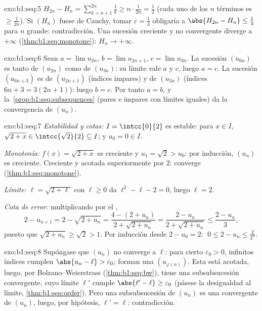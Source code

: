 \begin{solution}{exo:b1:seq:5}
$H_{2n} - H_n = \sum_{k=n+1}^{2n} \frac 1k \geq n \cdot \frac{1}{2n} =
\frac12$ (cada uno de los $n$ términos es $\geq \frac{1}{2n}$). Si
$(H_n)$ fuese de Cauchy, tomar $\varepsilon = \frac13$ obligaría a
$\abs{H_{2n} - H_n} \leq \frac13$ para $n$ grande: contradicción. Una
sucesión creciente y no convergente diverge a $+\infty$
(\cref{thm:b1:seq:monotone}): $H_n \to +\infty$.
\end{solution}

\begin{solution}{exo:b1:seq:6}
Sean $a = \lim u_{2n}$, $b = \lim u_{2n+1}$, $c = \lim u_{3n}$. La
sucesión $(u_{6n})$ es  tanto de $(u_{2n})$ como de
$(u_{3n})$: su límite vale $a$ y $c$, luego $a = c$. La sucesión
$(u_{6n+3})$ es  de $(u_{2n+1})$ (índices impares) y de
$(u_{3n})$ (índices $6n + 3 = 3(2n+1)$): luego $b = c$. Por tanto
$a = b$, y la~\cref{prop:b1:seq:subsequences} (pares e impares con
límites iguales) da la convergencia de $(u_n)$.
\end{solution}

\begin{solution}{exo:b1:seq:7}
\emph{Estabilidad y cotas:} $I = \intcc{0}{2}$ es estable: para
$x \in I$, $\sqrt{2 + x} \in \intcc{\sqrt 2}{2} \subseteq I$; y
$u_0 = 0 \in I$.

\emph{Monotonía:} $f(x) = \sqrt{2+x}$ es creciente y
$u_1 = \sqrt 2 > u_0$: por inducción, $(u_n)$ es creciente. Creciente
y acotada superiormente por $2$: converge
(\cref{thm:b1:seq:monotone}).

\emph{Límite:} $\ell = \sqrt{2 + \ell}$ con $\ell \geq 0$ da
$\ell^2 - \ell - 2 = 0$, luego $\ell = 2$.

\emph{Cota de error:} multiplicando por el ,
\[
2 - u_{n+1} = 2 - \sqrt{2 + u_n}
= \frac{4 - (2 + u_n)}{2 + \sqrt{2+u_n}}
= \frac{2 - u_n}{2 + \sqrt{2 + u_n}}
\leq \frac{2 - u_n}{3},
\]
puesto que $\sqrt{2 + u_n} \geq \sqrt 2 > 1$. Por inducción desde
$2 - u_0 = 2$: $\;0 \leq 2 - u_n \leq \frac{2}{3^n}$.
\end{solution}

\begin{solution}{exo:b1:seq:8}
Supóngase que $(u_n)$ no converge a $\ell$: para cierto
$\varepsilon_0 > 0$, infinitos índices cumplen
$\abs{u_n - \ell} > \varepsilon_0$; forman una 
$(u_{\varphi(n)})$. Esta  está acotada, luego, por
Bolzano--Weierstrass (\cref{thm:b1:seq:bw}), tiene una
subsubsucesión convergente, cuyo límite $\ell'$ cumple
$\abs{\ell' - \ell} \geq \varepsilon_0$ (pásese la desigualdad al
límite, \cref{thm:b1:seq:order}). Pero una subsubsucesión de $(u_n)$ es
una  convergente de $(u_n)$, luego, por hipótesis,
$\ell' = \ell$: contradicción.
\end{solution}

